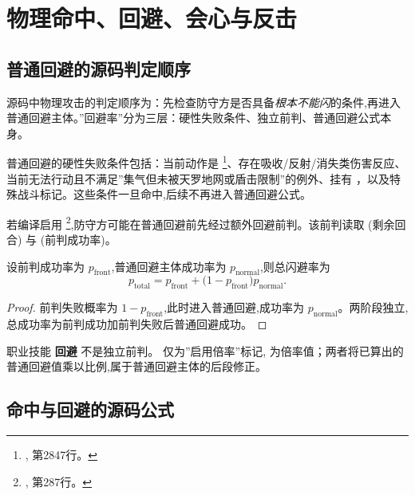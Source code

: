 \chapter{物理命中、回避、会心与反击}

\section{普通回避的源码判定顺序}

源码中物理攻击的判定顺序为：先检查防守方是否具备\emph{根本不能闪}的条件,再进入普通回避主体。”回避率”分为三层：硬性失败条件、独立前判、普通回避公式本身。

普通回避的硬性失败条件包括：当前动作是 \footnote{, 第2847行。}、存在吸收/反射/消失类伤害反应、当前无法行动且不满足”集气但未被天罗地网或盾击限制”的例外、挂有 ，以及特殊战斗标记。这些条件一旦命中,后续不再进入普通回避公式。

若编译启用 \footnote{, 第287行。},防守方可能在普通回避前先经过额外回避前判。该前判读取  (剩余回合) 与  (前判成功率)。

\begin{theorem}[回避前判与普通回避的复合]
\label{thm:duck-front-composite}
设前判成功率为 $p_{\mathrm{front}}$,普通回避主体成功率为 $p_{\mathrm{normal}}$,则总闪避率为
\begin{equation}
    p_{\mathrm{total}} = p_{\mathrm{front}} + \bigl(1-p_{\mathrm{front}}\bigr)p_{\mathrm{normal}}.
\end{equation}
\end{theorem}

\begin{proof}
前判失败概率为 $1-p_{\mathrm{front}}$,此时进入普通回避,成功率为 $p_{\mathrm{normal}}$。两阶段独立,总成功率为前判成功加前判失败后普通回避成功。
\end{proof}

\begin{remark}
职业技能 \textbf{回避} 不是独立前判。 仅为”启用倍率”标记, 为倍率值；两者将已算出的普通回避值乘以比例,属于普通回避主体的后段修正。
\end{remark}

\section{命中与回避的源码公式}

